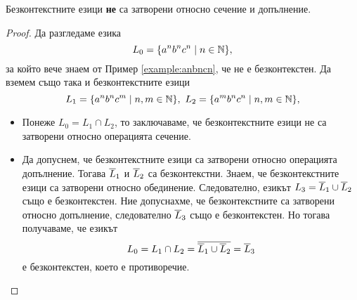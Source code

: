 \begin{thm}
  Безконтекстните езици {\bf не} са затворени относно сечение и допълнение.
\end{thm}
\begin{proof}
  Да разгледаме езика
  \[L_0 = \{a^nb^nc^n\mid n\in\mathbb{N}\},\] за който вече знаем от Пример \ref{example:anbncn}, че не е безконтекстен.
  Да вземем също така и безконтекстните езици 
  \[L_1 = \{a^nb^nc^m\mid n,m\in\mathbb{N}\},\ L_2 = \{a^mb^nc^n\mid n,m\in\mathbb{N}\},\]
  \begin{itemize}
  \item 
    Понеже $L_0 = L_1\cap L_2$, то заключаваме, че безконтекстните езици не са затворени 
    относно операцията сечение.
  \item
    Да допуснем, че безконтекстните езици са затворени относно операцията допълнение.
    Тогава  $\overline{L}_1$ и $\overline{L}_2$ са безконтекстни.
    Знаем, че безконтекстните езици са затворени относно обединение. 
    Следователно, езикът $L_3 = \overline{L}_1 \cup \overline{L}_2$ също е безконтекстен.
    Ние допуснахме, че безконтекстните са затворени относно допълнение, следователно $\overline{L}_3$
    също е безконтекстен.
    Но тогава получаваме, че езикът
    \[L_0 = L_1 \cap L_2 = \overline{\overline{L}_1 \cup \overline{L}_2} = \overline{L}_3\]
    е безконтекстен, което е противоречие.
  \end{itemize}
\end{proof}

